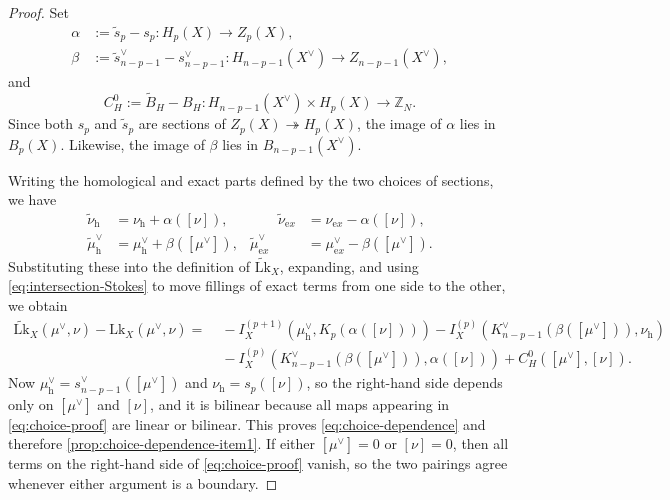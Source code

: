 \documentclass[10pt,a4paper]{amsart}
\newcommand{\Lk}{\mathrm{Lk}}
\begin{document}
\begin{proof}
	Set
	\begin{equation}
		\begin{aligned}
			\alpha&:=\widetilde s_p-s_p:H_p(X)\to Z_p(X),
			\\
			\beta&:=\widetilde s^\vee_{n-p-1}-s^\vee_{n-p-1}:H_{n-p-1}(X^\vee)\to Z_{n-p-1}(X^\vee),
		\end{aligned}
		\label{eq:secDiffs}
	\end{equation}
	and
	\begin{equation}
		C_H^{0}:=\widetilde B_H-B_H:
		H_{n-p-1}(X^\vee)\times H_p(X)\to \mathbb Z_N.
	\end{equation}
	Since both \(s_p\) and \(\widetilde s_p\) are sections of
	\(Z_p(X)\twoheadrightarrow H_p(X)\), the image of \(\alpha\) lies in \(B_p(X)\).
	Likewise, the image of \(\beta\) lies in \(B_{n-p-1}(X^\vee)\).
	
	Writing the homological and exact parts defined by the two choices of sections, we have
	\begin{equation}
		\begin{aligned}
			\widetilde\nu_{\mathrm h}&=\nu_{\mathrm h}+\alpha([\nu]),
			&\qquad
			\widetilde\nu_{\mathrm ex}&=\nu_{\mathrm ex}-\alpha([\nu]),
			\\
			\widetilde\mu^\vee_{\mathrm h}&=\mu^\vee_{\mathrm h}+\beta([\mu^\vee]),
			&
			\widetilde\mu^\vee_{\mathrm ex}&=\mu^\vee_{\mathrm ex}-\beta([\mu^\vee]).
		\end{aligned}
	\end{equation}
	Substituting these into the definition of \(\widetilde{\Lk}_X\), expanding, and using
	\eqref{eq:intersection-Stokes} to move fillings of exact terms from one side to the
	other, we obtain
	\begin{equation}
		\begin{aligned}
			\widetilde{\Lk}_X(\mu^\vee,\nu)-\Lk_X(\mu^\vee,\nu)
			=&\;
			-I_X^{(p+1)}\left(\mu^\vee_{\mathrm h},K_p(\alpha([\nu]))\right)
			-I_X^{(p)}\left(K^\vee_{n-p-1}(\beta([\mu^\vee])),\nu_{\mathrm h}\right)
			\\
			&\;
			-I_X^{(p)}\left(K^\vee_{n-p-1}(\beta([\mu^\vee])),\alpha([\nu])\right)
			+C_H^{0}([\mu^\vee],[\nu]).
		\end{aligned}
		\label{eq:choice-proof}
	\end{equation}
	Now \(\mu^\vee_{\mathrm h}=s^\vee_{n-p-1}([\mu^\vee])\) and
	\(\nu_{\mathrm h}=s_p([\nu])\), so the right-hand side depends only on
	\([\mu^\vee]\) and \([\nu]\), and it is bilinear because all maps appearing in
	\eqref{eq:choice-proof} are linear or bilinear. This proves
	\eqref{eq:choice-dependence} and therefore
	\ref{prop:choice-dependence-item1}. If either \([\mu^\vee]=0\) or \([\nu]=0\),
	then all terms on the right-hand side of \eqref{eq:choice-proof} vanish, so the two
	pairings agree whenever either argument is a boundary.
	

\end{proof}
\end{document}
